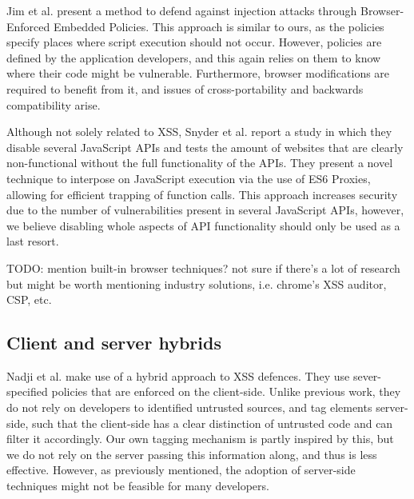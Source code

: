  Jim et al. \cite{Jim:2007:DSI:1242572.1242654} present a method to defend against injection attacks through Browser-Enforced Embedded Policies. This approach is similar to ours, as the policies specify places where script execution should not occur. However, policies are defined by the application developers, and this again relies on them to know where their code might be vulnerable. Furthermore, browser modifications are required to benefit from it, and issues of cross-portability and backwards compatibility arise.

Although not solely related to XSS, Snyder et al. \cite{Snyder:2017:MWD:3133956.3133966} report a study in which they disable several JavaScript APIs and tests the amount of websites that are clearly non-functional without the full functionality of the APIs. They present a novel technique to interpose on JavaScript execution via the use of ES6 Proxies, allowing for efficient trapping of function calls. This approach increases security due to the number of vulnerabilities present in several JavaScript APIs, however, we believe disabling whole aspects of API functionality should only be used as a last resort.

TODO: mention built-in browser techniques? not sure if there's a lot of research but might be worth mentioning industry solutions, i.e. chrome's XSS auditor, CSP, etc.

\subsection{Client and server hybrids}
Nadji et al. \cite{Nadji:2009} make use of a hybrid approach to XSS defences. They use sever-specified policies that are enforced on the client-side. Unlike previous work, they do not rely on developers to identified untrusted sources, and tag elements server-side, such that the client-side has a clear distinction of untrusted code and can filter it accordingly. Our own tagging mechanism is partly inspired by this, but we do not rely on the server passing this information along, and thus is less effective. However, as previously mentioned, the adoption of server-side techniques might not be feasible for many developers.

